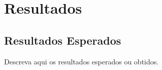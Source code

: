\chapter{Resultados}\label{sec:resultados}
\section{Resultados Esperados}
Descreva aqui os resultados esperados ou obtidos.

